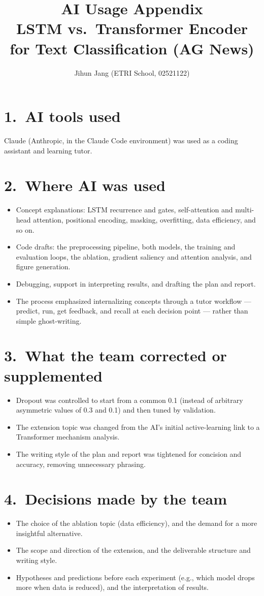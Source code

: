 \documentclass[10pt,a4paper]{article}
\title{\vspace{-1.5em}AI Usage Appendix\\[2pt]
\large LSTM vs.\ Transformer Encoder for Text Classification (AG News)}
\author{Jihun Jang (ETRI School, 02521122)}
\date{}
\begin{document}
\maketitle
\vspace{-1.5em}

\section*{1.\ AI tools used}
Claude (Anthropic, in the Claude Code environment) was used as a coding assistant and learning tutor.

\section*{2.\ Where AI was used}
\begin{itemize}
\item Concept explanations: LSTM recurrence and gates, self-attention and multi-head attention, positional encoding, masking, overfitting, data efficiency, and so on.
\item Code drafts: the preprocessing pipeline, both models, the training and evaluation loops, the ablation, gradient saliency and attention analysis, and figure generation.
\item Debugging, support in interpreting results, and drafting the plan and report.
\item The process emphasized internalizing concepts through a tutor workflow --- predict, run, get feedback, and recall at each decision point --- rather than simple ghost-writing.
\end{itemize}

\section*{3.\ What the team corrected or supplemented}
\begin{itemize}
\item Dropout was controlled to start from a common 0.1 (instead of arbitrary asymmetric values of 0.3 and 0.1) and then tuned by validation.
\item The extension topic was changed from the AI's initial active-learning link to a Transformer mechanism analysis.
\item The writing style of the plan and report was tightened for concision and accuracy, removing unnecessary phrasing.
\end{itemize}

\section*{4.\ Decisions made by the team}
\begin{itemize}
\item The choice of the ablation topic (data efficiency), and the demand for a more insightful alternative.
\item The scope and direction of the extension, and the deliverable structure and writing style.
\item Hypotheses and predictions before each experiment (e.g., which model drops more when data is reduced), and the interpretation of results.
\end{itemize}
\end{document}
